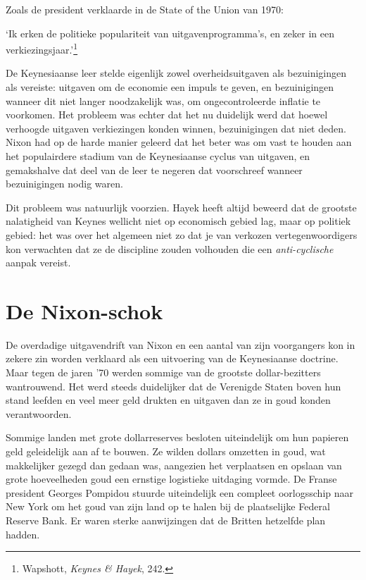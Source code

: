 \documentclass[
  a5paper,
  smalldemyvopaper,11pt,twoside,onecolumn,openright,extrafontsizes,
hidelinks]{memoir}
\renewenvironment{quote}%
               {\list{}{\rightmargin=.3cm\leftmargin=.3cm}%
                \itshape \item[]}%
               {\endlist}
\begin{document}
Zoals de president verklaarde in de State of the Union van 1970:

\begin{quote}
`Ik erken de politieke populariteit van uitgavenprogramma's, en zeker in
een verkiezingsjaar.'\footnote{\hspace{0pt}Wapshott, \emph{Keynes \&
  Hayek}, 242.}
\end{quote}

De Keynesiaanse leer stelde eigenlijk zowel overheidsuitgaven als
bezuinigingen als vereiste: uitgaven om de economie een impuls te geven,
en bezuinigingen wanneer dit niet langer noodzakelijk was, om
ongecontroleerde inflatie te voorkomen. Het probleem was echter dat het
nu duidelijk werd dat hoewel verhoogde uitgaven verkiezingen konden
winnen, bezuinigingen dat niet deden. Nixon had op de harde manier
geleerd dat het beter was om vast te houden aan het populairdere stadium
van de Keynesiaanse cyclus van uitgaven, en gemakshalve dat deel van de
leer te negeren dat voorschreef wanneer bezuinigingen nodig waren.

Dit probleem was natuurlijk voorzien. Hayek heeft altijd beweerd dat de
grootste nalatigheid van Keynes wellicht niet op economisch gebied lag,
maar op politiek gebied: het was over het algemeen niet zo dat je van
verkozen vertegenwoordigers kon verwachten dat ze de discipline zouden
volhouden die een \emph{anti-cyclische} aanpak vereist.

\section{De Nixon-schok}\label{de-nixon-schok}

De overdadige uitgavendrift van Nixon en een aantal van zijn voorgangers
kon in zekere zin worden verklaard als een uitvoering van de
Keynesiaanse doctrine. Maar tegen de jaren '70 werden sommige van de
grootste dollar-bezitters wantrouwend. Het werd steeds duidelijker dat
de Verenigde Staten boven hun stand leefden en veel meer geld drukten en
uitgaven dan ze in goud konden verantwoorden.

Sommige landen met grote dollarreserves besloten uiteindelijk om hun
papieren geld geleidelijk aan af te bouwen. Ze wilden dollars omzetten
in goud, wat makkelijker gezegd dan gedaan was, aangezien het
verplaatsen en opslaan van grote hoeveelheden goud een ernstige
logistieke uitdaging vormde. De Franse president Georges Pompidou
stuurde uiteindelijk een compleet oorlogsschip naar New York om het goud
van zijn land op te halen bij de plaatselijke Federal Reserve Bank. Er
waren sterke aanwijzingen dat de Britten hetzelfde plan hadden.
\end{document}
